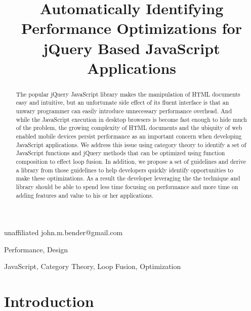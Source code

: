 \documentclass[preprint]{sigplanconf}
\begin{document}
\copyrightdata{[to be supplied]}


\title{Automatically Identifying Performance Optimizations for jQuery Based JavaScript Applications}

           {unaffiliated}
           {john.m.bender@gmail.com}

\maketitle

\begin{abstract}
The popular \cite{bib:usage} jQuery JavaScript library makes the manipulation of HTML documents easy and intuitive, but an unfortunate side effect of its fluent interface is that an unwary programmer can easily introduce unnecessary performance overhead. And while the JavaScript execution in desktop browsers is become fast enough to hide much of the problem, the growing complexity of HTML documents and the ubiquity of web enabled mobile devices persist performance as an important concern when developing JavaScript applications. We address this issue using category theory to identify a set of JavaScript functions and jQuery methods that can be optimized using function composition to effect loop fusion. In addition, we propose a set of guidelines and derive a library from those guidelines to help developers quickly identify opportunities to make these optimizations. As a result the developer leveraging the the technique and library should be able to spend less time focusing on performance and more time on adding features and value to his or her applications.
\end{abstract}


\terms
Performance, Design

\keywords
JavaScript, Category Theory, Loop Fusion, Optimization

\section{Introduction}
\end{document}
